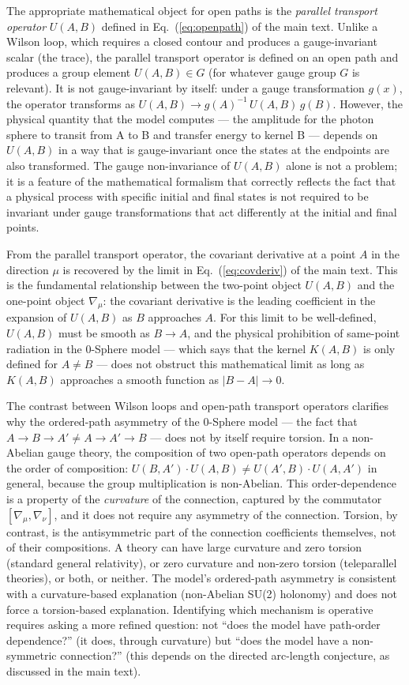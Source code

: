 \documentclass[%
 reprint,
 amsmath,amssymb,
 aps,
 prb,
]{revtex4-2}
\numberwithin{equation}{section}
\begin{document}
The appropriate mathematical object for open paths is the \emph{parallel transport operator} $U(A,B)$ defined in Eq.~(\ref{eq:openpath}) of the main text. Unlike a Wilson loop, which requires a closed contour and produces a gauge-invariant scalar (the trace), the parallel transport operator is defined on an open path and produces a group element $U(A,B) \in G$ (for whatever gauge group $G$ is relevant). It is not gauge-invariant by itself: under a gauge transformation $g(x)$, the operator transforms as $U(A,B) \to g(A)^{-1}\,U(A,B)\,g(B)$. However, the physical quantity that the model computes --- the amplitude for the photon sphere to transit from A to B and transfer energy to kernel B --- depends on $U(A,B)$ in a way that is gauge-invariant once the states at the endpoints are also transformed. The gauge non-invariance of $U(A,B)$ alone is not a problem; it is a feature of the mathematical formalism that correctly reflects the fact that a physical process with specific initial and final states is not required to be invariant under gauge transformations that act differently at the initial and final points.

From the parallel transport operator, the covariant derivative at a point $A$ in the direction $\mu$ is recovered by the limit in Eq.~(\ref{eq:covderiv}) of the main text. This is the fundamental relationship between the two-point object $U(A,B)$ and the one-point object $\nabla_\mu$: the covariant derivative is the leading coefficient in the expansion of $U(A,B)$ as $B$ approaches $A$. For this limit to be well-defined, $U(A,B)$ must be smooth as $B\to A$, and the physical prohibition of same-point radiation in the 0-Sphere model --- which says that the kernel $K(A,B)$ is only defined for $A\neq B$ --- does not obstruct this mathematical limit as long as $K(A,B)$ approaches a smooth function as $|B-A|\to 0$.

The contrast between Wilson loops and open-path transport operators clarifies why the ordered-path asymmetry of the 0-Sphere model --- the fact that $A\to B\to A' \neq A\to A'\to B$ --- does not by itself require torsion. In a non-Abelian gauge theory, the composition of two open-path operators depends on the order of composition: $U(B,A')\cdot U(A,B) \neq U(A',B)\cdot U(A,A')$ in general, because the group multiplication is non-Abelian. This order-dependence is a property of the \emph{curvature} of the connection, captured by the commutator $[\nabla_\mu, \nabla_\nu]$, and it does not require any asymmetry of the connection. Torsion, by contrast, is the antisymmetric part of the connection coefficients themselves, not of their compositions. A theory can have large curvature and zero torsion (standard general relativity), or zero curvature and non-zero torsion (teleparallel theories), or both, or neither. The model's ordered-path asymmetry is consistent with a curvature-based explanation (non-Abelian SU(2) holonomy) and does not force a torsion-based explanation. Identifying which mechanism is operative requires asking a more refined question: not ``does the model have path-order dependence?'' (it does, through curvature) but ``does the model have a non-symmetric connection?'' (this depends on the directed arc-length conjecture, as discussed in the main text).
\end{document}
